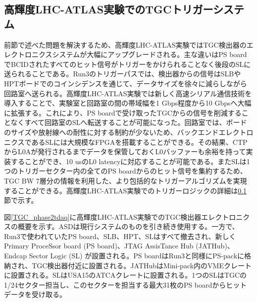     \subsection{高輝度LHC-ATLAS実験でのTGCトリガーシステム}  
前節で述べた問題を解決するため、高輝度LHC-ATLAS実験ではTGC検出器のエレクトロニクスシステムが大幅にアップグレードされる。主な違いはPS boardでBCIDされたすべてのヒット信号がトリガーをかけられることなく後段のSLに送られることである。Run3のトリガーパスでは、検出器からの信号はSLBやHPTボードでのコインシデンスを通じて、データサイズを徐々に減らしながら回路室へ送られる。高輝度LHC-ATLAS実験では新しく高速シリアル通信技術を導入することで、実験室と回路室の間の帯域幅を1 Gbps程度から10 Gbpsへ大幅に拡張する。これにより、PS boardで受け取ったTGCからの信号を削減することなくすべて回路室のSLへ転送することが可能になった。回路室では、ボードのサイズや放射線への耐性に対する制約が少ないため、バックエンドエレクトロニクスであるSLには大規模なFPGAを搭載することができる。その結果、CTPからL0Aが発行されるまでデータを保管しておくL0バッファーも余裕を持って実装することができ、10 usのL0 latencyに対応することが可能である。またSLは1つのトリガーセクター内の全てのPS boardからのヒット信号を集約するため、TGC BW 7層分の情報を利用した、より包括的なトリガーアルゴリズムを実現することができる。高輝度LHC-ATLAS実験でのトリガーロジックの詳細は\ref{}節で示す。

図\ref{TGC_phase2tdaq}に高輝度LHC-ATLAS実験でのTGC検出器エレクトロニクスの概要を示す。ASDは現行システムのものを引き続き使用する。一方で、Run3で使われていたPS board、SLB、HPT、SLはすべて撤去され、新しくPrimary ProceSsor board (PS board)、JTAG AssisTance Hub (JATHub)、Endcap Sector Logic (SL) が設置される。PS boardはRun3と同様にPS-packに格納され、TGC検出器付近に設置される。JATHubはMini-pack内のVMEクレートに設置される。SLはUSA15のATCAクレートに設置される。1つのSLはTGCの1/24セクター担当し、このセクターを担当する最大31枚のPS boardからヒットデータを受け取る。

